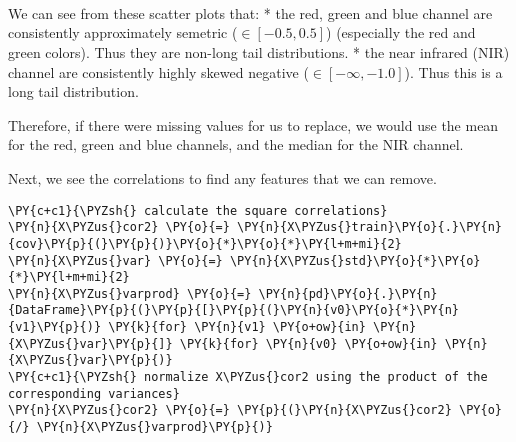     \begin{center}
    \end{center}
    { \hspace*{\fill} \\}
    
    \begin{center}
    \end{center}
    { \hspace*{\fill} \\}
    
    \begin{center}
    \end{center}
    { \hspace*{\fill} \\}
    
    We can see from these scatter plots that: * the red, green and blue
channel are consistently approximately semetric (\(\in [-0.5, 0.5]\))
(especially the red and green colors). Thus they are non-long tail
distributions. * the near infrared (NIR) channel are consistently highly
skewed negative (\(\in [-\infty,-1.0]\)). Thus this is a long tail
distribution.

Therefore, if there were missing values for us to replace, we would use
the mean for the red, green and blue channels, and the median for the
NIR channel.

    Next, we see the correlations to find any features that we can remove.

    \begin{tcolorbox}[breakable, size=fbox, boxrule=1pt, pad at break*=1mm,colback=cellbackground, colframe=cellborder]
\begin{Verbatim}[commandchars=\\\{\}]
\PY{c+c1}{\PYZsh{} calculate the square correlations}
\PY{n}{X\PYZus{}cor2} \PY{o}{=} \PY{n}{X\PYZus{}train}\PY{o}{.}\PY{n}{cov}\PY{p}{(}\PY{p}{)}\PY{o}{*}\PY{o}{*}\PY{l+m+mi}{2}
\PY{n}{X\PYZus{}var} \PY{o}{=} \PY{n}{X\PYZus{}std}\PY{o}{*}\PY{o}{*}\PY{l+m+mi}{2}
\PY{n}{X\PYZus{}varprod} \PY{o}{=} \PY{n}{pd}\PY{o}{.}\PY{n}{DataFrame}\PY{p}{(}\PY{p}{[}\PY{p}{(}\PY{n}{v0}\PY{o}{*}\PY{n}{v1}\PY{p}{)} \PY{k}{for} \PY{n}{v1} \PY{o+ow}{in} \PY{n}{X\PYZus{}var}\PY{p}{]} \PY{k}{for} \PY{n}{v0} \PY{o+ow}{in} \PY{n}{X\PYZus{}var}\PY{p}{)}
\PY{c+c1}{\PYZsh{} normalize X\PYZus{}cor2 using the product of the corresponding variances}
\PY{n}{X\PYZus{}cor2} \PY{o}{=} \PY{p}{(}\PY{n}{X\PYZus{}cor2} \PY{o}{/} \PY{n}{X\PYZus{}varprod}\PY{p}{)}
\end{Verbatim}
\end{tcolorbox}

